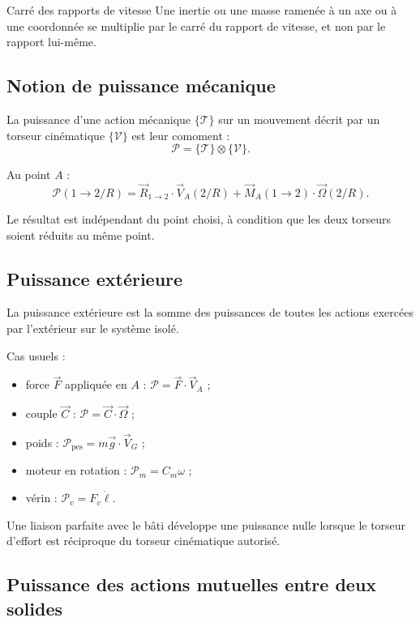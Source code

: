 \begin{TLWarning}{Carré des rapports de vitesse}
Une inertie ou une masse ramenée à un axe ou à une coordonnée se multiplie par le carré du rapport de vitesse, et non par le rapport lui-même.
\end{TLWarning}

\subsection{Notion de puissance mécanique}

La puissance d'une action mécanique $\{\mathcal T\}$ sur un mouvement décrit par un torseur cinématique $\{\mathcal V\}$ est leur comoment :
\[
\mathcal P=\{\mathcal T\}\otimes\{\mathcal V\}.
\]

Au point $A$ :
\[
\mathcal P(1\rightarrow2/R)=
\vec R_{1\rightarrow2}\cdot\vec V_A(2/R)
+\vec M_A(1\rightarrow2)\cdot\vec\Omega(2/R).
\]

Le résultat est indépendant du point choisi, à condition que les deux torseurs soient réduits au même point.

\subsection{Puissance extérieure}

La puissance extérieure est la somme des puissances de toutes les actions exercées par l'extérieur sur le système isolé.

Cas usuels :
\begin{itemize}
  \item force $\vec F$ appliquée en $A$ : $\mathcal P=\vec F\cdot\vec V_A$ ;
  \item couple $\vec C$ : $\mathcal P=\vec C\cdot\vec\Omega$ ;
  \item poids : $\mathcal P_{\mathrm{pes}}=m\vec g\cdot\vec V_G$ ;
  \item moteur en rotation : $\mathcal P_m=C_m\omega$ ;
  \item vérin : $\mathcal P_v=F_v\dot\ell$.
\end{itemize}

Une liaison parfaite avec le bâti développe une puissance nulle lorsque le torseur d'effort est réciproque du torseur cinématique autorisé.

\subsection{Puissance des actions mutuelles entre deux solides}

